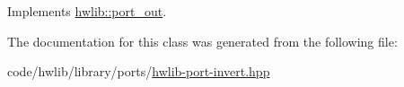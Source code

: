 Implements \hyperlink{classhwlib_1_1port__out_a3644bf484ebe059ec5bf17fa43e0c01b}{hwlib\+::port\+\_\+out}.



The documentation for this class was generated from the following file\+:\begin{DoxyCompactItemize}
\item 
code/hwlib/library/ports/\hyperlink{hwlib-port-invert_8hpp}{hwlib-\/port-\/invert.\+hpp}\end{DoxyCompactItemize}
